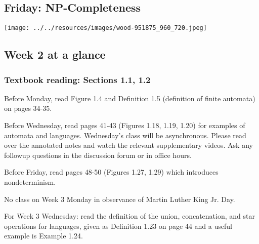 \newpage
\subsection*{Friday: NP-Completeness}


\newpage


\begin{center}
\texttt{[image: ../../resources/images/wood-951875\_960\_720.jpeg]}
\end{center}


\newpage

\subsection*{Week 2 at a glance}

\vspace{-15pt}

\subsubsection*{Textbook reading: Sections 1.1, 1.2}

\vspace{-15pt}

Before Monday, read Figure 1.4 and Definition 1.5 (definition of finite automata) on pages 34-35.

Before Wednesday, read pages 41-43 (Figures 1.18, 1.19, 1.20) for examples of automata and languages. Wednesday's class will be asynchronous. Please read over the annotated notes and watch the relevant supplementary videos. Ask any followup questions in the discussion forum or in office hours.

Before Friday, read pages 48-50 (Figures 1.27, 1.29) which introduces nondeterminism.

No class on Week 3 Monday in observance of Martin Luther King Jr. Day.

For Week 3 Wednesday: read the definition of the union, concatenation, and star operations for languages,  given 
as Definition 1.23 on page 44 and a useful example is Example 1.24.

\vspace{-20pt}

